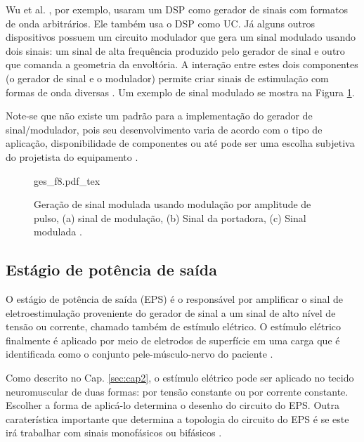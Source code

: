 Wu et al. \cite{Wu2002}, por exemplo, usaram um \acrshort{DSP} como gerador de sinais com formatos de onda arbitrários. Ele também usa o \acrshort{DSP} como \acrshort{UC}. Já alguns outros dispositivos possuem um circuito modulador que gera um sinal modulado usando dois sinais: um sinal de alta frequência produzido pelo gerador de sinal e outro que comanda a geometria da envoltória. A interação entre estes dois componentes (o gerador de sinal e o modulador) permite criar sinais de estimulação com formas de onda diversas \cite{Wu2002, Nogueira2017a,KhosravaniSanaz2011}. Um exemplo de sinal modulado se mostra na Figura \ref{fig:ges_f8}.

Note-se que não existe um padrão para a implementação do gerador de sinal/modulador, pois seu desenvolvimento varia de acordo com o tipo de aplicação, disponibilidade de componentes ou até pode ser uma escolha subjetiva do projetista do equipamento \cite{Souza2017, Popovic2004}.

\vspace{0.3cm}
\begin{figure}
    \centering %
    \small %
    \def\svgwidth{0.42
    \columnwidth}%
    {ges_f8.pdf_tex}
    \caption{Geração de sinal modulada usando modulação por amplitude de pulso, (a) sinal de modulação, (b) Sinal da portadora, (c) Sinal modulada   \cite{Martins2008}.}
    \label{fig:ges_f8}
\end{figure}

\subsection{Estágio de potência de saída}
\label{sub_cap:eps}

O estágio de potência de saída (\acrshort{EPS}) é o responsável por amplificar o sinal de eletroestimulação proveniente do gerador de sinal a um sinal de alto nível de tensão ou corrente, chamado também de estímulo elétrico. O estímulo elétrico finalmente é aplicado por meio de eletrodos de superfície em uma carga que é identificada como o conjunto pele-músculo-nervo do paciente \cite{Souza2017}.

Como descrito no Cap. \ref{sec:cap2}, o estímulo elétrico pode ser aplicado no tecido neuromuscular de duas formas: por tensão constante ou por corrente constante. Escolher a forma de aplicá-lo determina o desenho do circuito do \acrshort{EPS}. Outra caraterística importante que determina a topologia do circuito do \acrshort{EPS} é se este irá trabalhar com sinais monofásicos ou bifásicos \cite{Ilic1994}. 

